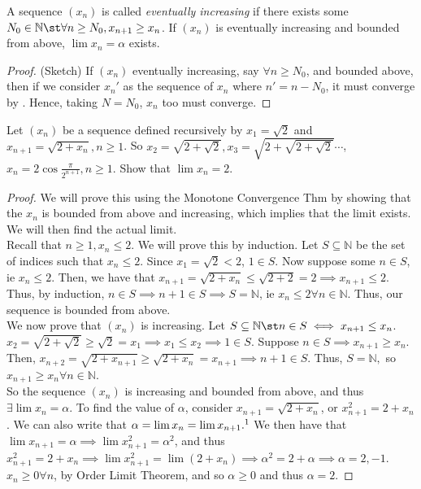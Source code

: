 \documentclass[12pt]{article}
\begin{document}
\begin{example}
  A sequence $(x_n)$ is called \emph{eventually increasing} if there exists some $N_0 \in \mathbb{N} \st \forall n \geq N_0, x_{n+1} \geq x_n$. If $(x_n)$ is eventually increasing and bounded from above, $\lim x_n = \alpha$ exists.
  \begin{proof}(Sketch) If $(x_n)$ eventually increasing, say $\forall n \geq N_0$, and bounded above, then if we consider $x_n'$ as the sequence of $x_n$ where $n' = n - N_0$, it must converge by . Hence, taking $N = N_0$, $x_n$ too must converge.
  \end{proof}
\end{example}

\begin{example}
  Let $(x_n)$ be a sequence defined recursively by $x_1 = \sqrt{2}$ and $x_{n+1} = \sqrt{2 + x_n}, n \geq 1$. So $x_2 = \sqrt{2 + \sqrt{2}}, x_3 = \sqrt{2 + \sqrt{2 + \sqrt{2}}} \cdots$, $x_n = 2 \cos \frac{\pi}{2^{n+1}}, n \geq 1$. Show that $\lim x_n = 2$.
  \begin{proof}
    We will prove this using the Monotone Convergence Thm by showing that the $x_n$ is bounded from above and increasing, which implies that the limit exists. We will then find the actual limit.\\
    Recall that $n \geq 1, x_n \leq 2$. We will prove this by induction. Let $S \subseteq \mathbb{N}$ be the set of indices such that $x_n \leq 2$. Since $x_1 = \sqrt{2} < 2$, $1 \in S$. Now suppose some $n \in S$, ie $x_n \leq 2$. Then, we have that $x_{n+1} = \sqrt{2 + x_n} \leq \sqrt{2+2} = 2 \implies x_{n+1} \leq 2$. Thus, by induction, $n \in S \implies n+1 \in S \implies S = \mathbb{N}$, ie $x_{n} \leq 2 \forall n \in \mathbb{N}$. Thus, our sequence is bounded from above.\\
    We now prove that $(x_n)$ is increasing. Let $S \subseteq \mathbb{N} \st n \in S \iff x_{n+1} \leq x_n$. $x_2 = \sqrt{2 + \sqrt{2}} \geq \sqrt{2} = x_1 \implies x_1 \leq x_2 \implies 1 \in S$. Suppose $n \in S \implies x_{n+1} \geq x_n$. Then, $x_{n+2} = \sqrt{2 + x_{n+1}} \geq \sqrt{2 + x_n} = x_{n+1} \implies n+1 \in S$. Thus, $S = \mathbb{N}, $ so $x_{n+1} \geq x_{n} \forall n \in \mathbb{N}$.\\
    So the sequence $(x_n)$ is increasing and bounded from above, and thus $\exists \lim x_n = \alpha$. To find the value of $\alpha$, consider $x_{n+1} = \sqrt{2 + x_n}$, or $x_{n+1}^2 = 2 + x_n$. We can also write that $\alpha = \lim x_n = \lim x_{n+1}.\footnotemark$ We then have that $\lim x_{n+1} = \alpha \implies \lim x_{n+1}^2 = \alpha^2$, and thus $x_{n+1}^2 = 2+ x_n \implies \lim  x_{n+1}^2 = \lim (2+x_n) \implies \alpha^2 = 2 + \alpha  \implies \alpha = 2, -1$. $x_n \geq 0 \forall n$, by Order Limit Theorem, and so $\alpha \geq 0$ and thus $\alpha = 2$.
  \end{proof}
\end{example}
\end{document}
